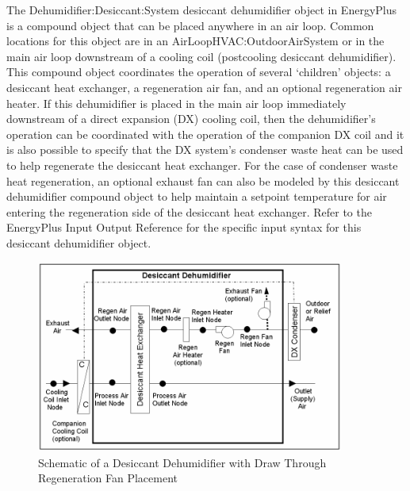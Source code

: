 The Dehumidifier:Desiccant:System desiccant dehumidifier object in EnergyPlus is a compound object that can be placed anywhere in an air loop. Common locations for this object are in an AirLoopHVAC:OutdoorAirSystem or in the main air loop downstream of a cooling coil (postcooling desiccant dehumidifier). This compound object coordinates the operation of several `children' objects: a desiccant heat exchanger, a regeneration air fan, and an optional regeneration air heater. If this dehumidifier is placed in the main air loop immediately downstream of a direct expansion (DX) cooling coil, then the dehumidifier's operation can be coordinated with the operation of the companion DX coil and it is also possible to specify that the DX system's condenser waste heat can be used to help regenerate the desiccant heat exchanger. For the case of condenser waste heat regeneration, an optional exhaust fan can also be modeled by this desiccant dehumidifier compound object to help maintain a setpoint temperature for air entering the regeneration side of the desiccant heat exchanger. Refer to the EnergyPlus Input Output Reference for the specific input syntax for this desiccant dehumidifier object.

\begin{figure}[hbtp] %
\centering
\includegraphics[width=0.9\textwidth, height=0.9\textheight, keepaspectratio=true]{media/image5199.png}
\caption{Schematic of a Desiccant Dehumidifier with Draw Through Regeneration Fan Placement \protect \label{fig:schematic-of-a-desiccant-dehumidifier-with}}
\end{figure}

